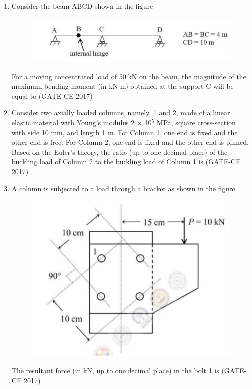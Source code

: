 \documentclass[journal,12pt,onecolumn]{article}
\theoremstyle{remark}
\begin{document}
\begin{enumerate}
    \item Consider the beam ABCD shown in the figure 
    \begin{figure}[H]
    \centering
    \includegraphics[width=0.7\columnwidth]{imageq41.jpg}  
    \caption{}
    \label{fig:41}
    \end{figure}
    For a moving concentrated load of 50 kN on the beam, the magnitude of the maximum bending moment (in kN-m) obtained at the support C will be equal to \underline{\hspace{3cm}}\hfill (GATE-CE 2017)

    \item Consider two axially loaded columns, namely, 1 and 2, made of a linear elastic material with Young's modulus 2 $\times$ 10$^5$ MPa, square cross-section with side 10 mm, and length 1 m. For Column 1, one end is fixed and the other end is free. For Column 2, one end is fixed and the other end is pinned. Based on the Euler's theory, the ratio (up to one decimal place) of the buckling load of Column 2 to the buckling load of Column 1 is \underline{\hspace{3cm}}\hfill (GATE-CE 2017)

    \item A column is subjected to a load through a bracket as shown in the figure 
    \begin{figure}[H]
    \centering
    \includegraphics[width=0.7\columnwidth]{imageq43.jpg}  
    \caption{}
    \label{fig:43}
    \end{figure}
    The resultant force (in kN, up to one decimal place) in the bolt 1 is \underline{\hspace{3cm}}\hfill (GATE-CE 2017)


\end{enumerate}
\end{document}
